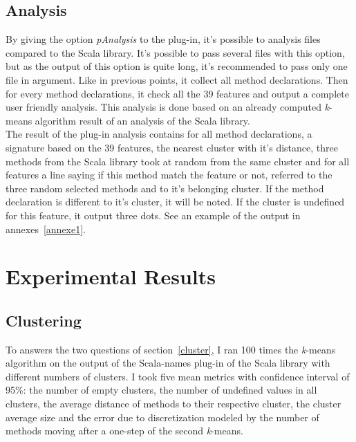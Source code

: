 \documentclass[12pt]{article}
\begin{document}
\subsection{Analysis}
\label{analysis}
By giving the option \textit{pAnalysis} to the plug-in, it's possible to analysis files compared to the Scala library. It's possible to pass several files with this option, but as the output of this option is quite long, it's recommended to pass only one file in argument. Like in previous points, it collect all method declarations. Then for every method declarations, it check all the 39 features and output a complete user friendly analysis. This analysis is done based on an already computed \textit{k}-means algorithm result of an analysis of the Scala library.\\
The result of the plug-in analysis contains for all method declarations, a signature based on the 39 features, the nearest cluster with it's distance, three methods from the Scala library took at random from the same cluster and for all features a line saying if this method match the feature or not, referred to the three random selected methods and to it's belonging cluster. If the method declaration is different to it's cluster, it will be noted. If the cluster is undefined for this feature, it output three dots. See an example of the output in annexes~\ref{annexe1}.
\section {Experimental Results}

\subsection {Clustering}
\label{cluster:exp}
To answers the two questions of section~\ref{cluster}, I ran 100 times the \textit{k}-means algorithm on the output of the Scala-names plug-in of the Scala library with different numbers of clusters. I took five mean metrics with confidence interval of 95\%: the number of empty clusters, the number of undefined values in all clusters, the average distance of methods to their respective cluster, the cluster average size and the error due to discretization modeled by the number of methods moving after a one-step of the second \textit{k}-means. 
\end{document}
